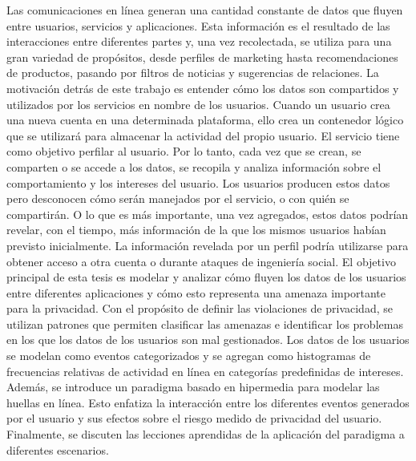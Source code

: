 Las comunicaciones en línea generan una cantidad constante de datos que fluyen entre usuarios, servicios y aplicaciones. Esta información es el resultado de las interacciones entre diferentes partes y, una vez recolectada, se utiliza para una gran variedad de propósitos, desde perfiles de marketing hasta recomendaciones de productos, pasando por filtros de noticias y sugerencias de relaciones. La motivación detrás de este trabajo es entender cómo los datos son compartidos y utilizados por los servicios en nombre de los usuarios. Cuando un usuario crea una nueva cuenta en una determinada plataforma, ello crea un contenedor lógico que se utilizará para almacenar la actividad del propio usuario. El servicio tiene como objetivo perfilar al usuario. Por lo tanto, cada vez que se crean, se comparten o se accede a los datos, se recopila y analiza información sobre el comportamiento y los intereses del usuario. Los usuarios producen estos datos pero desconocen cómo serán manejados por el servicio, o con quién se compartirán. O lo que es más importante, una vez agregados, estos datos podrían revelar, con el tiempo, más información de la que los mismos usuarios habían previsto inicialmente. La información revelada por un perfil podría utilizarse para obtener acceso a otra cuenta o durante ataques de ingeniería social. El objetivo principal de esta tesis es modelar y analizar cómo fluyen los datos de los usuarios entre diferentes aplicaciones y cómo esto representa una amenaza importante para la privacidad. Con el propósito de definir las violaciones de privacidad, se utilizan patrones que permiten clasificar las amenazas e identificar los problemas en los que los datos de los usuarios son mal gestionados. Los datos de los usuarios se modelan como eventos categorizados y se agregan como histogramas de frecuencias relativas de actividad en línea en categorías predefinidas de intereses. Además, se introduce un paradigma basado en hipermedia para modelar las huellas en línea. Esto enfatiza la interacción entre los diferentes eventos generados por el usuario y sus efectos sobre el riesgo medido de privacidad del usuario. Finalmente, se discuten las lecciones aprendidas de la aplicación del paradigma a diferentes escenarios.